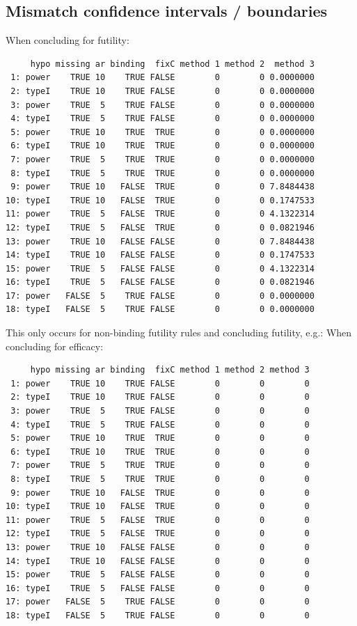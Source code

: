 \documentclass[12pt]{article}
\begin{document}
\clearpage

\subsection{Mismatch confidence intervals / boundaries}
\label{sec:orgbc53257}

When concluding for futility:
\begin{verbatim}
     hypo missing ar binding  fixC method 1 method 2  method 3
 1: power    TRUE 10    TRUE FALSE        0        0 0.0000000
 2: typeI    TRUE 10    TRUE FALSE        0        0 0.0000000
 3: power    TRUE  5    TRUE FALSE        0        0 0.0000000
 4: typeI    TRUE  5    TRUE FALSE        0        0 0.0000000
 5: power    TRUE 10    TRUE  TRUE        0        0 0.0000000
 6: typeI    TRUE 10    TRUE  TRUE        0        0 0.0000000
 7: power    TRUE  5    TRUE  TRUE        0        0 0.0000000
 8: typeI    TRUE  5    TRUE  TRUE        0        0 0.0000000
 9: power    TRUE 10   FALSE  TRUE        0        0 7.8484438
10: typeI    TRUE 10   FALSE  TRUE        0        0 0.1747533
11: power    TRUE  5   FALSE  TRUE        0        0 4.1322314
12: typeI    TRUE  5   FALSE  TRUE        0        0 0.0821946
13: power    TRUE 10   FALSE FALSE        0        0 7.8484438
14: typeI    TRUE 10   FALSE FALSE        0        0 0.1747533
15: power    TRUE  5   FALSE FALSE        0        0 4.1322314
16: typeI    TRUE  5   FALSE FALSE        0        0 0.0821946
17: power   FALSE  5    TRUE FALSE        0        0 0.0000000
18: typeI   FALSE  5    TRUE FALSE        0        0 0.0000000
\end{verbatim}

This only occurs for non-binding futility rules and concluding futility, e.g.:
When concluding for efficacy:
\begin{verbatim}
     hypo missing ar binding  fixC method 1 method 2 method 3
 1: power    TRUE 10    TRUE FALSE        0        0        0
 2: typeI    TRUE 10    TRUE FALSE        0        0        0
 3: power    TRUE  5    TRUE FALSE        0        0        0
 4: typeI    TRUE  5    TRUE FALSE        0        0        0
 5: power    TRUE 10    TRUE  TRUE        0        0        0
 6: typeI    TRUE 10    TRUE  TRUE        0        0        0
 7: power    TRUE  5    TRUE  TRUE        0        0        0
 8: typeI    TRUE  5    TRUE  TRUE        0        0        0
 9: power    TRUE 10   FALSE  TRUE        0        0        0
10: typeI    TRUE 10   FALSE  TRUE        0        0        0
11: power    TRUE  5   FALSE  TRUE        0        0        0
12: typeI    TRUE  5   FALSE  TRUE        0        0        0
13: power    TRUE 10   FALSE FALSE        0        0        0
14: typeI    TRUE 10   FALSE FALSE        0        0        0
15: power    TRUE  5   FALSE FALSE        0        0        0
16: typeI    TRUE  5   FALSE FALSE        0        0        0
17: power   FALSE  5    TRUE FALSE        0        0        0
18: typeI   FALSE  5    TRUE FALSE        0        0        0
\end{verbatim}
\end{document}
